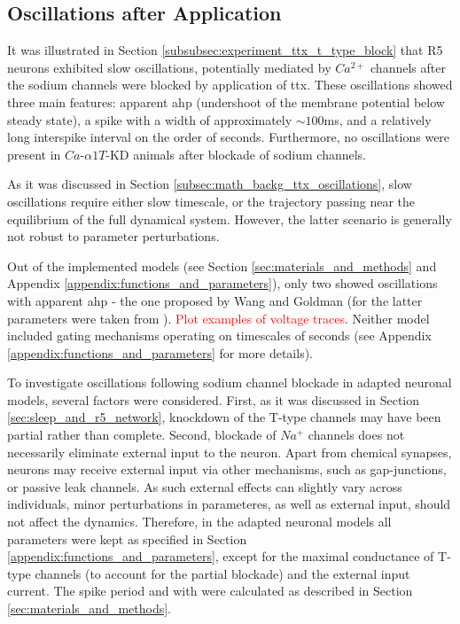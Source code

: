 \documentclass[../main.tex]{subfiles}
\begin{document}
\subsection{Oscillations after  Application}

It was illustrated in Section \ref{subsubsec:experiment_ttx_t_type_block} that R5 neurons exhibited slow oscillations, potentially mediated by $Ca^{2+}$ channels after the sodium channels were blocked by application of \gls{ttx}. These oscillations showed three main features: apparent \gls{ahp} (undershoot of the membrane potential below steady state), a spike with a width of approximately $\sim 100$ms, and a relatively long interspike interval on the order of seconds.
Furthermore, no oscillations were present in $Ca$-$\alpha 1T$-KD animals after blockade of sodium channels.

As it was discussed in Section \ref{subsec:math_backg_ttx_oscillations}, slow oscillations require either slow timescale, or the trajectory passing near the equilibrium of the full dynamical system. However, the latter scenario is generally not robust to parameter perturbations.

Out of the implemented models (see Section \ref{sec:materials_and_methods} and Appendix \ref{appendix:functions_and_parameters}), only two showed oscillations with apparent \gls{ahp} - the one proposed by Wang \parencite{wangMultipleDynamicalModes1994} and Goldman \parencite{goldmanGlobalStructureRobustness2001} (for the latter parameters were taken from \parencite{franciRobustTunableBursting2018}). \textcolor{red}{Plot examples of voltage traces}. Neither model included gating mechanisms operating on timescales of seconds (see Appendix \ref{appendix:functions_and_parameters} for more details). 

To investigate oscillations following sodium channel blockade in adapted neuronal models, several factors were considered. First, as it was discussed in Section \ref{sec:sleep_and_r5_network}, knockdown of the T-type channels may have been partial rather than complete. Second, blockade of $Na^+$ channels does not necessarily eliminate external input to the neuron. Apart from chemical synapses, neurons may receive external input via other mechanisms, such as gap-junctions, or passive leak channels. As such external effects can slightly vary across individuals, minor perturbations in parameteres, as well as external input, should not affect the dynamics.
Therefore, in the adapted neuronal models all parameters were kept as specified in Section \ref{appendix:functions_and_parameters}, except for the maximal conductance of T-type channels (to account for the partial blockade) and the external input current. The spike period and with were calculated as described in Section \ref{sec:materials_and_methods}.
\end{document}
